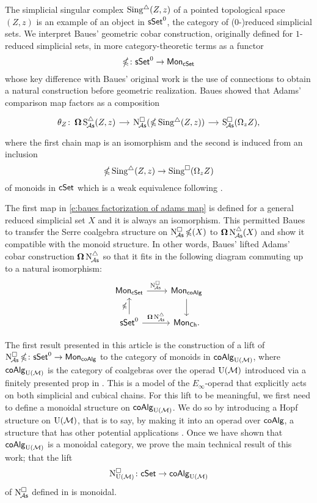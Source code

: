 The simplicial singular complex  $\operatorname{Sing^{\triangle}}(Z,z)$ of a pointed topological space $(Z,z)$ is an example of an object in $\mathsf{sSet}^0$, the category of ($0$-)reduced simplicial sets.
We interpret Baues' geometric cobar construction, originally defined for $1$-reduced simplicial sets, in more category-theoretic terms as a functor
\begin{equation} \label{e:cubical cobar construction}
\operatorname{\mathbb{\Omega}} \colon \mathsf{sSet}^0 \to \mathsf{Mon}_{\mathsf{cSet}}
\end{equation}
whose key difference with Baues' original work is the use of connections to obtain a natural construction before geometric realization.
Baues showed that Adams' comparison map factors as a composition
\begin{equation} \label{e:baues factorization of adams map}
\begin{tikzcd}[column sep = small]
\theta_Z \colon \cobar \sSchainsA(Z,z) \arrow[r] &
\cchainsA(\ccobar \sSing(Z,z)) \arrow[r] &
\cSchainsA(\loops_z Z),
\end{tikzcd}
\end{equation}
where the first chain map is an isomorphism and the second is induced from an inclusion
\[
\operatorname{\mathbb{\Omega}} \operatorname{Sing^{\triangle}}(Z,z) \to \operatorname{Sing^{\square}}(\Omega_z Z)
\]
of monoids in $\mathsf{cSet}$ which is a weak equivalence following \cite{rivera2019path}.

The first map in \eqref{e:baues factorization of adams map} is defined for a general reduced simplicial set $X$ and it is always an isomorphism.
This permitted Baues to transfer the Serre coalgebra structure on $\operatorname{N^{\square}_{\!{\mathcal{A}\mathsf{s}}}} \operatorname{\mathbb{\Omega}}(X)$ to $\operatorname{\mathbf{\Omega}} \operatorname{N^{\triangle}_{\!{\mathcal{A}\mathsf{s}}}}(X)$ and show it compatible with the monoid structure.
In other words, Baues' lifted Adams' cobar construction $\operatorname{\mathbf{\Omega}} \operatorname{N^{\triangle}_{\!{\mathcal{A}\mathsf{s}}}}$ so that it fits in the following diagram commuting up to a natural isomorphism:
\[
\begin{tikzcd}
\Mon_{\cSet} \arrow[r, "\cchainsA \ "] & \Mon_{\coAlg} \arrow[d] \\
\sSet^0 \arrow[r, "\cobar \schainsA"] \arrow[u, "\ccobar"] & \Mon_{\Ch}.
\end{tikzcd}
\]

The first result presented in this article is the construction of a lift of $\operatorname{N^{\square}_{\!{\mathcal{A}\mathsf{s}}}} \operatorname{\mathbb{\Omega}} \colon \mathsf{sSet}^0 \to \mathsf{Mon}_{\mathsf{coAlg}}$ to the category of monoids in $\mathsf{coAlg}_{\operatorname{U}(\mathcal{M})}$, where $\mathsf{coAlg}_{\operatorname{U}(\mathcal{M})}$ is the category of coalgebras over the operad ${\operatorname{U}(\mathcal{M})}$ introduced via a finitely presented prop in \cite{medina2020prop1}.
This is a model of the $E_\infty$-operad that explicitly acts on both simplicial and cubical chains.
For this lift to be meaningful, we first need to define a monoidal structure on $\mathsf{coAlg}_{\operatorname{U}(\mathcal{M})}$.
We do so by introducing a Hopf structure on ${\operatorname{U}(\mathcal{M})}$, that is to say, by making it into an operad over $\mathsf{coAlg}$, a structure that has other potential applications \cite{livernet2008hopf}.
Once we have shown that $\mathsf{coAlg}_{\operatorname{U}(\mathcal{M})}$ is a monoidal category, we prove the main technical result of this work; that the lift
\[\operatorname{N^{\square}_{{\operatorname{U}(\mathcal{M})}}} \colon \mathsf{cSet} \to \mathsf{coAlg}_{\operatorname{U}(\mathcal{M})}
\]
of $\operatorname{N^{\square}_{\!{\mathcal{A}\mathsf{s}}}}$ defined in \cite{medina2021cubical} is monoidal.


